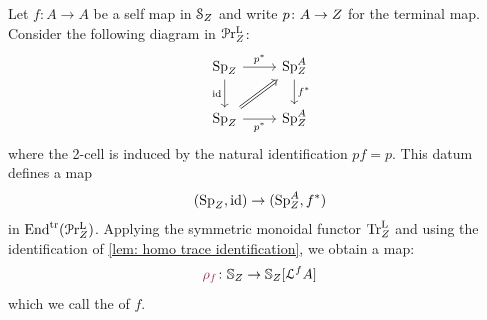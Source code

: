 \begin{cons}
   Let $f\colon A\to A$ be a self map in $\mathcal{S}_{Z}$ and
   write $p\colon A\to Z$ for the terminal map.
   Consider the following diagram in $\mathcal{P}\mathrm{r}^{\mathrm{L}}_{Z}$:
   \[\begin{tikzcd}
	{\pSp{\base}{}} & {\pSp{\base}{A}} \\
	{\pSp{\base}{}} & {\pSp{\base}{A}}
	\arrow["{p^{*}}", from=1-1, to=1-2]
	\arrow["{\id}"', from=1-1, to=2-1]
	\arrow["f^*", from=1-2, to=2-2]
	\arrow[Rightarrow, from=2-1, to=1-2]
	\arrow["{p^*}"', from=2-1, to=2-2]
\end{tikzcd} \]
where the 2-cell is induced by the natural identification
$pf=p$. This datum defines a map
\[ (\operatorname{Sp}_{Z}^{},\operatorname{id})\to (\operatorname{Sp}_{Z}^{A},f^*)\]
in $\mathrm{End}^{\mathrm{tr}}(\mathcal{P}\mathrm{r}^{\mathrm{L}}_{Z})$. Applying
the symmetric monoidal functor $\mathrm{Tr}^{\mathrm{L}}_{Z}$ 
and using the identification of \cref{lem: homo trace identification}, we obtain a map:
\[ \mdef{\rho_f}\colon \SS_{\base} \to \SS_{\base}[\cL^fA] \]
which we call the  of $f$. 
\end{cons}

